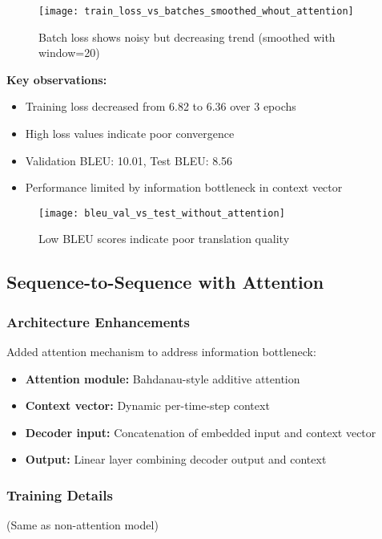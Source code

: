 \documentclass[12pt]{article}
\begin{document}
\begin{figure}[H]
    \centering
    \texttt{[image: train\_loss\_vs\_batches\_smoothed\_whout\_attention]}
    \caption{Batch loss shows noisy but decreasing trend (smoothed with window=20)}
\end{figure}

\textbf{Key observations:}
\begin{itemize}
    \item Training loss decreased from 6.82 to 6.36 over 3 epochs
    \item High loss values indicate poor convergence
    \item Validation BLEU: 10.01, Test BLEU: 8.56
    \item Performance limited by information bottleneck in context vector
\end{itemize}

\begin{figure}[H]
    \centering
    \texttt{[image: bleu\_val\_vs\_test\_without\_attention]}
    \caption{Low BLEU scores indicate poor translation quality}
\end{figure}

\subsection{Sequence-to-Sequence with Attention}

\subsubsection*{Architecture Enhancements}
Added attention mechanism to address information bottleneck:
\begin{itemize}
    \item \textbf{Attention module:} Bahdanau-style additive attention
    \item \textbf{Context vector:} Dynamic per-time-step context
    \item \textbf{Decoder input:} Concatenation of embedded input and context vector
    \item \textbf{Output:} Linear layer combining decoder output and context
\end{itemize}

\subsubsection*{Training Details}
(Same as non-attention model)
\end{document}
